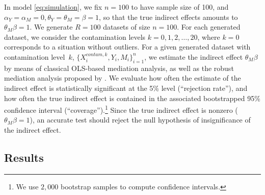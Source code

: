 \documentclass[12pt]{article}
\begin{document}
In model \eqref{eq:simulation}, we fix $n=100$ to have sample size of 100, and $\alpha_Y = \alpha_M = 0, \theta_Y = \theta_M = \beta = 1$, so that the true indirect effects amounts to $\theta_M \beta=1$. We generate $R=100$ datasets of size $n=100$. For each generated dataset, we consider the contamination levels $k=0,1,2,\dots,20$, where $k=0$ corresponds to a situation without outliers. For a given generated dataset with contamination level~$k$, $\{X_i^{contam,k}, Y_i, M_i\}_{i=1}^n$, we estimate the indirect effect $\theta_M \beta$ by means of classical OLS-based mediation analysis, as well as the robust mediation analysis proposed by \cite{alfons2021}. We evaluate how often the estimate of the indirect effect is statistically significant at the 5\% level (``rejection rate''), and how often the true indirect effect is contained in the associated bootstrapped 95\% confidence interval (``coverage'').\footnote{We use $2,000$ bootstrap samples to compute confidence intervals.} Since the true indirect effect is nonzero ($\theta_M \beta = 1$), an accurate test should reject the null hypothesis of insignificance of the indirect effect.

\subsection{Results}
\end{document}
